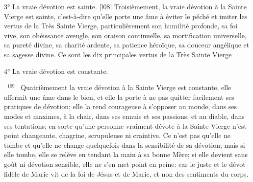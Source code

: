 \documentclass[paper=a5,pagesize=pdftex,fontsize=15pt,headinclude=on,twoside=off]{scrbook}
\newcommand{\negphantom}[1]{\settowidth{\dimen0}{#1}\hspace*{-\dimen0}}
\newcommand{\versenb}[1]{\par \vspace{10pt}~\negphantom{~${}^{#1}$~}${}^{#1}$~}
\begin{document}
3° La vraie dévotion est sainte.
[l08] Troisièmement, la vraie dévotion à la Sainte Vierge est sainte, c'est-à-dire qu'elle porte une âme à éviter le
péché et imiter les vertus de la Très Sainte Vierge, particulièrement son humilité profonde, sa foi vive, son
obéissance aveugle, son oraison continuelle, sa mortification universelle, sa pureté divine, sa charité ardente, sa
patience héroïque, sa douceur angélique et sa sagesse divine. Ce sont les dix principales vertus de la Très Sainte
Vierge

4° La vraie dévotion est constante.
\versenb{109} Quatrièmement la vraie dévotion à la Sainte Vierge est constante, elle affermit une âme dans le bien, et elle
la porte à ne pas quitter facilement ses pratiques de dévotion; elle la rend courageuse à s'opposer au monde, dans
ses modes et maximes, à la chair, dans ses ennuis et ses passions, et au diable, dans ses tentations; en sorte
qu'une personne vraiment dévote à la Sainte Vierge n'est point changeante, chagrine, scrupuleuse ni craintive. Ce
n'est pas qu'elle ne tombe et qu'elle ne change quelquefois dans la sensibilité de sa dévotion; mais si elle tombe,
elle se relève en tendant la main à sa bonne Mère; si elle devient sans goût ni dévotion sensible, elle ne s'en met
point en peine: car le juste et le dévot fidèle de Marie vit de la foi de Jésus et de Marie, et non des sentiments du
corps.
\end{document}
